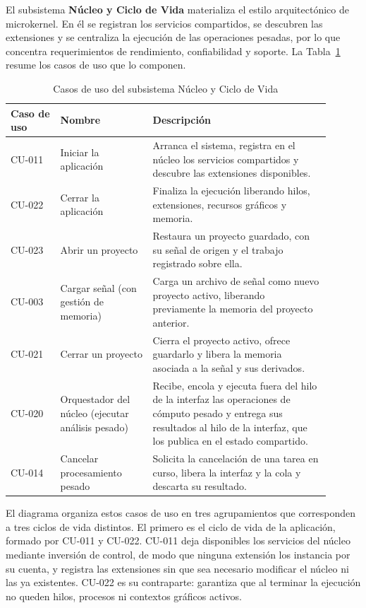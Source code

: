 \documentclass[11pt,a4paper]{article}
\DeclareRobustCommand{\_}{\textunderscore\allowbreak}
\begin{document}
El subsistema \textbf{N\'ucleo y Ciclo de Vida} materializa el estilo arquitect\'onico de microkernel. En \'el se registran los servicios compartidos, se descubren las extensiones y se centraliza la ejecuci\'on de las operaciones pesadas, por lo que concentra requerimientos de rendimiento, confiabilidad y soporte. La Tabla~\ref{tab:cu_nucleo} resume los casos de uso que lo componen.

\begin{table}[H]
    \centering
    \caption{Casos de uso del subsistema N\'ucleo y Ciclo de Vida}
    \label{tab:cu_nucleo}
    \begin{tabular}{|p{0.14\linewidth}|p{0.26\linewidth}|p{0.50\linewidth}|}
        \hline
        \textbf{Caso de uso} & \textbf{Nombre} & \textbf{Descripci\'on} \\
        \hline
        CU-011 & Iniciar la aplicaci\'on & Arranca el sistema, registra en el n\'ucleo los servicios compartidos y descubre las extensiones disponibles. \\
        \hline
        CU-022 & Cerrar la aplicaci\'on & Finaliza la ejecuci\'on liberando hilos, extensiones, recursos gr\'aficos y memoria. \\
        \hline
        CU-023 & Abrir un proyecto & Restaura un proyecto guardado, con su se\~nal de origen y el trabajo registrado sobre ella. \\
        \hline
        CU-003 & Cargar se\~nal (con gesti\'on de memoria) & Carga un archivo de se\~nal como nuevo proyecto activo, liberando previamente la memoria del proyecto anterior. \\
        \hline
        CU-021 & Cerrar un proyecto & Cierra el proyecto activo, ofrece guardarlo y libera la memoria asociada a la se\~nal y sus derivados. \\
        \hline
        CU-020 & Orquestador del n\'ucleo (ejecutar an\'alisis pesado) & Recibe, encola y ejecuta fuera del hilo de la interfaz las operaciones de c\'omputo pesado y entrega sus resultados al hilo de la interfaz, que los publica en el estado compartido. \\
        \hline
        CU-014 & Cancelar procesamiento pesado & Solicita la cancelaci\'on de una tarea en curso, libera la interfaz y la cola y descarta su resultado. \\
        \hline
    \end{tabular}
\end{table}

El diagrama organiza estos casos de uso en tres agrupamientos que corresponden a tres ciclos de vida distintos. El primero es el ciclo de vida de la aplicaci\'on, formado por CU-011 y CU-022. CU-011 deja disponibles los servicios del n\'ucleo mediante inversi\'on de control, de modo que ninguna extensi\'on los instancia por su cuenta, y registra las extensiones sin que sea necesario modificar el n\'ucleo ni las ya existentes. CU-022 es su contraparte: garantiza que al terminar la ejecuci\'on no queden hilos, procesos ni contextos gr\'aficos activos.
\end{document}
